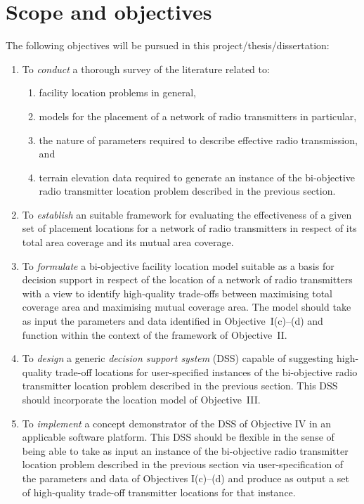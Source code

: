 \section{Scope and objectives}

The following objectives will be pursued in this project/thesis/dissertation:
\begin{enumerate}[label=\Roman*]										%
 \item To \textit{conduct} a thorough survey of the literature related to:
 \begin{enumerate}[label=(\alph*)]
  \item facility location problems in general,
  \item models for the placement of a network of radio transmitters in particular,
  \item the nature of parameters required to describe effective radio transmission, and
  \item terrain elevation data required to generate an instance of the bi-objective radio transmitter location problem described in the previous section.
 \end{enumerate}
 \item  To \textit{establish} an suitable framework for evaluating the effectiveness of a given set of placement locations for a network of radio transmitters in respect of its total area coverage and its mutual area coverage.
 \item To \textit{formulate} a bi-objective facility location model suitable as a basis for decision support in respect of the location of a network of radio transmitters with a view to identify high-quality trade-offs between maximising total coverage area and maximising mutual coverage area.  The model should take as input the parameters and data identified in Objective~I(c)--(d) and function within the context of the framework of Objective~II.
 \item To \textit{design} a generic \textit{decision support system} (DSS) capable of suggesting high-quality trade-off locations for user-specified instances of the bi-objective radio transmitter location problem described in the previous section.  This DSS should incorporate the location model of Objective~III.
 \item To \textit{implement} a concept demonstrator of the DSS of Objective IV in an applicable software platform.  This DSS should be flexible in the sense of being able to take as input an instance of the bi-objective radio transmitter location problem described in the previous section via user-specification of the parameters and data of Objectives I(c)--(d) and produce as output a set of high-quality trade-off transmitter locations for that instance.

\end{enumerate}
